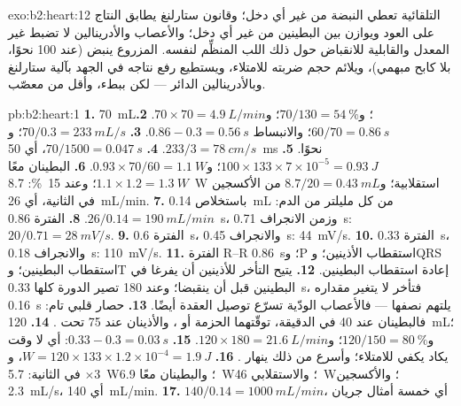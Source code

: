 \begin{solution}{exo:b2:heart:12}
التلقائية تعطي النبضة من غير أي دخل؛ وقانون ستارلنغ
يطابق النتاج على العود ويوازن بين البطينين من غير
أي دخل؛ والأعصاب والأدرينالين لا تضبط غير المعدل
والقابلية للانقباض حول ذلك اللب المنظِّم لنفسه.  المزروع
ينبض (عند 100 نحوًا، بلا كابح مبهمي)، ويلائم حجم ضربته
للامتلاء، ويستطيع رفع نتاجه في الجهد بآلية
ستارلنغ وبالأدرينالين الدائر --- لكن ببطء،
وأقل من  معصّب.
\end{solution}

\begin{solution}{pb:b2:heart:1}
\textbf{1.} \qty{70}{mL}؛ و$70/130 = \qty{54}{\%}$؛ و$70\times 70 =
\qty{4.9}{L/min}$.
\textbf{2.} $60/70 = \qty{0.86}{s}$؛ والانبساط $0.86 - 0.3 =
\qty{0.56}{s}$.
\textbf{3.} $70/0.3 = \qty{233}{mL/s}$؛ و$233/3 = \qty{78}{cm/s}$.
\textbf{4.} $70/1500 = \qty{0.047}{s}$، أي \qty{50}{ms} نحوًا.
\textbf{5.} $100\times 133\times 7\times 10^{-5} = \qty{0.93}{J}$؛
و$0.93\times 70/60 = \qty{1.1}{W}$.
\textbf{6.} البطينان معًا $1.1\times 1.2 = \qty{1.3}{W}$؛ وعند
\qty{15}{\%}: \qty{8.7}{W} استقلابية؛ و$8.7/20 = \qty{0.43}{mL}$ من
الأكسجين في الثانية، أي \qty{26}{mL/min}.
\textbf{7.} باستخلاص \qty{0.14}{mL} من كل مليلتر من الدم:
$26/0.14 = \qty{190}{mL/min}$.
\textbf{8.} الفترة \qty{0.86}{s}، وزمن الانجراف \qty{0.71}{s}:
$20/0.71 = \qty{28}{mV/s}$.
\textbf{9.} الفترة \qty{0.6}{s}، والانجراف \qty{0.45}{s}: \qty{44}{mV/s}.
\textbf{10.} الفترة \qty{0.33}{s}، والانجراف \qty{0.18}{s}: \qty{110}{mV/s}.
\textbf{11.} الفترة R--R \qty{0.86}{s}؛ وP استقطاب الأذينين؛ وQRS
استقطاب البطينين؛ وT إعادة استقطاب البطينين.
\textbf{12.} يتيح التأخر للأذينين أن يفرغا في البطينين
قبل أن ينقبضا؛ وعند 180 تصير الدورة كلها \qty{0.33}{s}، فتأخر
لا يتغير مقداره \qty{0.16}{s} يلتهم نصفها --- فالأعصاب
الودّية تسرّع توصيل العقدة أيضًا.
\textbf{13.} حصار قلبي تام: فالبطينان عند 40 في الدقيقة،
توقّتهما الحزمة أو ، والأذينان عند 75 تحت
.
\textbf{14.} \qty{120}{mL}؛ و$120/150 = \qty{80}{\%}$؛ و$120\times 180 =
\qty{21.6}{L/min}$.
\textbf{15.} $0.33 - 0.3 = \qty{0.03}{s}$: أي لا وقت يكاد يكفي للامتلاء؛
وأسرع من ذلك ينهار .
\textbf{16.} $W = 120\times 133\times 1.2\times 10^{-4} = \qty{1.9}{J}$،
و$\times 3$ في الثانية: \qty{5.7}{W}؛ والبطينان معًا \qty{6.9}{W}؛
والاستقلابي \qty{46}{W}؛ والأكسجين \qty{2.3}{mL/s}، أي \qty{140}{mL/min}.
\textbf{17.} $140/0.14 = \qty{1000}{mL/min}$، أي خمسة أمثال جريان

\end{solution}
